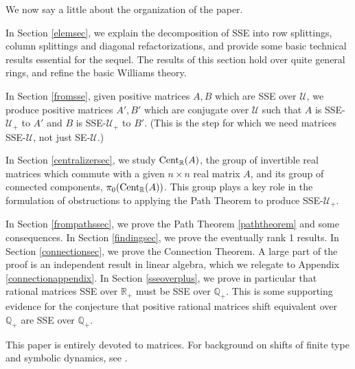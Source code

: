 \documentclass{amsart}
\theoremstyle{definition}
\theoremstyle{remark}
\numberwithin{equation}{section}
\begin{document}
We now say a little about the organization 
 of the paper.  

In Section \ref{elemsec}, we explain the decomposition 
of SSE into row splittings, column splittings and 
diagonal refactorizations, and provide 
some basic  technical results  
essential for the sequel. The results of this section 
hold over quite general rings, and refine the basic 
Williams theory. 
 
In Section \ref{fromsse}, given  positive matrices 
$A,B$ which are SSE over $\mathcal U$, we 
produce positive matrices $A',B'$ which are conjugate 
over $\mathcal U$ such that 
$A$ is SSE-$\mathcal U_+$ to $A'$ and 
$B$ is SSE-$\mathcal U_+$ to $B'$. 
(This is the step for which we need matrices 
SSE-$\mathcal U$, not just SE-$\mathcal U$.) 

In Section \ref{centralizersec}, we study 
$\textnormal{Cent}_{\mathbb R}(A)$, the group of invertible 
real matrices which commute with a given $n\times n$ real 
matrix $A$, and its group of connected components, 
$\pi_0( \textnormal{Cent}_{\mathbb R}(A) )$.  
This group plays a key role in the formulation of 
obstructions to applying the Path Theorem 
to produce SSE-$\mathcal U_+$. 

In Section \ref{frompathssec}, we prove the Path Theorem \ref{paththeorem} 
and some consequences. In Section \ref{findingsec}, we prove the 
eventually rank 1 results. 
In Section \ref{connectionsec}, we prove the Connection Theorem. 
A large part of the proof is an independent result in linear 
algebra, which we relegate to Appendix \ref{connectionappendix}. 
In Section \ref{sseoverplus}, we 
prove in particular that rational matrices SSE over $\mathbb R_+$ 
must be SSE over $\mathbb Q_+$. This is some supporting evidence 
for the conjecture \cite[Conj. 5.1]{B}
that positive rational matrices 
shift equivalent over $\mathbb Q_+$ are SSE over $\mathbb Q_+$. 

This paper is  entirely devoted to matrices. 
For background on shifts of finite type and symbolic dynamics, 
see \cite{Ki,LM}. 
\end{document}
